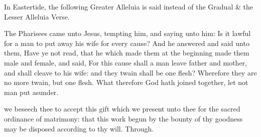 
\begin{rubric}
    In Eastertide, the following Greater Alleluia is said instead of the Gradual \& the Lesser Alleluia Verse.
\end{rubric}


 The Pharisees came unto Jesus, tempting him, and saying unto him: Is it lawful for a man to put away his wife for every cause? And he answered and said unto them, Have ye not read, that he which made them at the beginning made them male and female, and said, For this cause shall a man leave father and mother, and shall cleave to his wife: and they twain shall be one flesh? Wherefore they are no more twain, but one flesh. What therefore God hath joined together, let not man put asunder.


 we beseech thee to accept this gift which we present unto thee for the sacred ordinance of matrimony: that this work begun by the bounty of thy goodness may be disposed according to thy will. Through.

